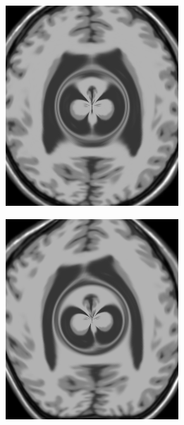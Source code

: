 \begin{figure}[H]
\begin{subfigure}[t]{0.23\textwidth}
	  \label{fig:sin-image}
	\end{subfigure}
	\begin{subfigure}[t]{0.23\textwidth}
	  \includegraphics[width=\textwidth]{figuras/movingImageDist.png}
	  \label{fig:dist-image}
	\end{subfigure}
	\begin{subfigure}[t]{0.23\textwidth}
	  \includegraphics[width=\textwidth]{figuras/movingImageSinDist.png}

\end{subfigure}
\end{figure}
